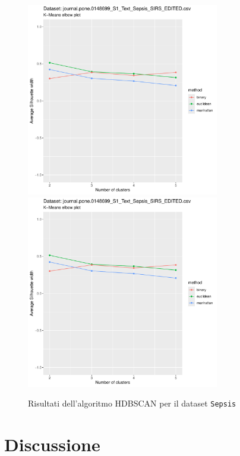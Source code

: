 \documentclass[a4paper, 12pt]{report}
\begin{document}
			\begin{figure}[H]
				\centering
				\includegraphics[width = 0.75\textwidth, height = 0.45\textheight, page = 7]{
					results/results_Sepsis.csv.pdf
				}
				\includegraphics[width = 0.75\textwidth, height = 0.45\textheight, page = 8]{
					results/results_Sepsis.csv.pdf
				}
				\caption{Risultati dell'algoritmo HDBSCAN per il dataset
				\texttt{Sepsis}}
				\label{fig:hdbscan5}
			\end{figure}

	\chapter{Discussione}
\end{document}
